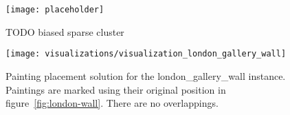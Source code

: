 \begin{figure}[h!]
    \texttt{[image: placeholder]}
    \caption
    {TODO biased sparse cluster}
    \label{fig:results:visualization-biased-sparse-cluster}
\end{figure}

\begin{figure}[h!]
    \texttt{[image: visualizations/visualization\_london\_gallery\_wall]}
    \caption[Painting placement solution for the london\_gallery\_wall instance]
        { Painting placement solution for the london\_gallery\_wall instance.
    Paintings are marked using their original position in figure~\ref{fig:london-wall}.
    There are no overlappings.}
    \label{fig:results:visualization-london-gallery-wall}
\end{figure}


